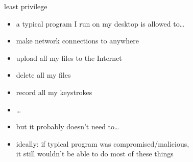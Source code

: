 
\begin{frame}{least privilege}
    \begin{itemize}
    \item a typical program I run on my desktop is allowed to\ldots
    \item make network connections to anywhere
    \item upload all my files to the Internet
    \item delete all my files
    \item record all my keystrokes
    \item \ldots
    \vspace{.5cm}
    \item but it probably doesn't need to\ldots
    \item ideally: if typical program was compromised/malicious, \\
          it still wouldn't be able to do most of these things
    \end{itemize}
\end{frame}

